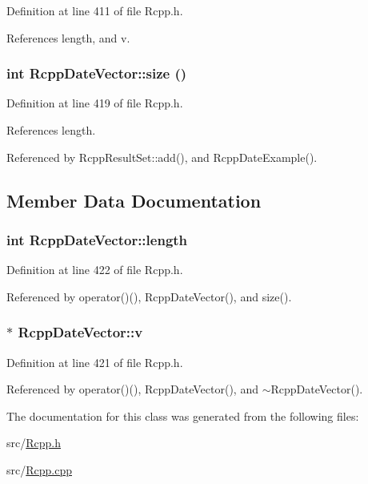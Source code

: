 Definition at line 411 of file Rcpp.h.

References length, and v.\hypertarget{classRcppDateVector_03db4282da968eb4e0ae2a38375e0d37}{
\subsubsection[{size}]{\setlength{\rightskip}{0pt plus 5cm}int RcppDateVector::size ()}}
\label{classRcppDateVector_03db4282da968eb4e0ae2a38375e0d37}




Definition at line 419 of file Rcpp.h.

References length.

Referenced by RcppResultSet::add(), and RcppDateExample().

\subsection{Member Data Documentation}
\hypertarget{classRcppDateVector_a36764f68111a84b737b78600ff06433}{
\subsubsection[{length}]{\setlength{\rightskip}{0pt plus 5cm}int {\bf RcppDateVector::length}}}
\label{classRcppDateVector_a36764f68111a84b737b78600ff06433}




Definition at line 422 of file Rcpp.h.

Referenced by operator()(), RcppDateVector(), and size().\hypertarget{classRcppDateVector_faa34ebaf3d8bac309e81895c376f545}{
\subsubsection[{v}]{$\ast$ {\bf RcppDateVector::v}}}
\label{classRcppDateVector_faa34ebaf3d8bac309e81895c376f545}




Definition at line 421 of file Rcpp.h.

Referenced by operator()(), RcppDateVector(), and $\sim$RcppDateVector().

The documentation for this class was generated from the following files:\begin{CompactItemize}
\item 
src/\hyperlink{Rcpp_8h}{Rcpp.h}\item 
src/\hyperlink{Rcpp_8cpp}{Rcpp.cpp}\end{CompactItemize}
